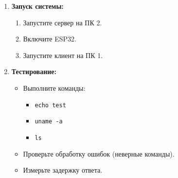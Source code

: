 \begin{enumerate}
\item \textbf{Запуск системы:}
\begin{enumerate}[label=\alph*)]
    \item Запустите сервер на ПК 2.
    \item Включите ESP32.
    \item Запустите клиент на ПК 1.
\end{enumerate}

\item \textbf{Тестирование:}
\begin{itemize}
    \item Выполните команды:
    \begin{itemize}
        \item \texttt{echo test}
        \item \texttt{uname -a}
        \item \texttt{ls}
    \end{itemize}
    \item Проверьте обработку ошибок (неверные команды).
    \item Измерьте задержку ответа.
\end{itemize}

\end{enumerate}

